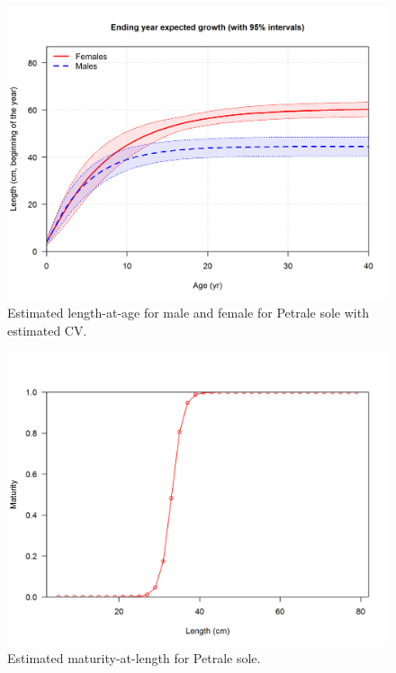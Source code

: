 \documentclass[12pt,]{article}
\begin{document}
\begin{figure}
\centering
\includegraphics{r4ss/plots_mod1/bio1_sizeatage.png}
\caption{Estimated length-at-age for male and female for Petrale sole
with estimated CV. \label{fig:sizeatage}}
\end{figure}

\FloatBarrier 

\begin{figure}
\centering
\includegraphics{r4ss/plots_mod1/bio6_maturity.png}
\caption{Estimated maturity-at-length for Petrale sole.
\label{fig:maturity}}
\end{figure}

\FloatBarrier
\end{document}
